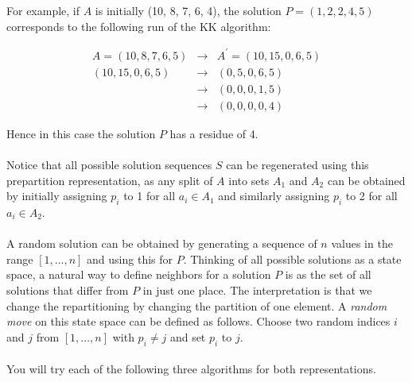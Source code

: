 \documentclass[tikz, 12pt]{scrartcl}
\begin{document}
For example, if $A$ is initially (10, 8, 7, 6, 4), the solution $P = (1, 2, 2, 4, 5)$ corresponds to the following run of the KK algorithm:

\begin{eqnarray}
A = (10, 8, 7, 6, 5)	&	\rightarrow	&	A^{\prime} = (10, 15, 0, 6, 5) \nonumber \\
(10, 15, 0, 6, 5)	&	\rightarrow	&	(0, 5, 0, 6, 5) \nonumber \\
					&	\rightarrow	&	(0, 0, 0, 1, 5) \nonumber \\
					&	\rightarrow	&	(0, 0, 0, 0, 4)
\end{eqnarray}

Hence in this case the solution $P$ has a residue of 4.\\
\\
Notice that all possible solution sequences $S$ can be regenerated using this prepartition representation, as any split of $A$ into sets $A_1$ and $A_2$ can be obtained by initially assigning $p_i$ to 1 for all $a_i \in A_1$ and similarly assigning $p_i$ to 2 for all $a_i \in A_2$.\\
\\
A random solution can be obtained by generating a sequence of $n$ values in the range $[1, \ldots, n]$ and using this for $P$. Thinking of all possible solutions as a state space, a natural way to define neighbors for a solution $P$ is as the set of all solutions that differ from $P$ in just one place. The interpretation is that we change the repartitioning by changing the partition of one element. A \textit{random move} on this state space can be defined as follows. Choose two random indices $i$ and $j$ from $[1, \ldots, n]$ with $p_i \neq j$ and set $p_i$ to $j$.\\
\\
You will try each of the following three algorithms for both representations.
\end{document}
